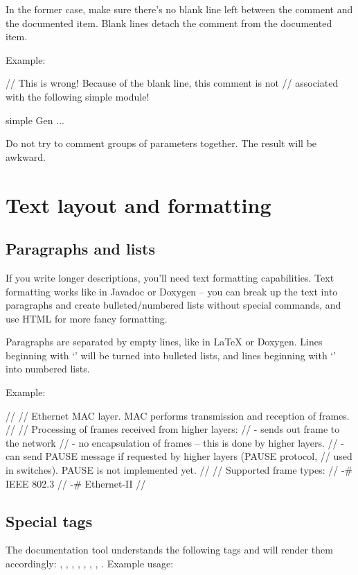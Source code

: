 In the former case, make sure there's no blank line left
between the comment and the documented item. Blank lines
detach the comment from the documented item.

Example:
\begin{ned}
// This is wrong! Because of the blank line, this comment is not
// associated with the following simple module!

simple Gen
{
    ...
}
\end{ned}

Do not try to comment groups of parameters together. The result
will be awkward.

\section{Text layout and formatting}

\subsection{Paragraphs and lists}

If you write longer descriptions, you'll need text formatting capabilities.
Text formatting works like in Javadoc or Doxygen -- you can break up the
text into paragraphs and create bulleted/numbered lists without
special commands, and use HTML for more fancy formatting.

Paragraphs are separated by empty lines, like in LaTeX or Doxygen.
Lines beginning with `\ttt{-}' will be turned into bulleted lists,
and lines beginning with `\ttt{-\#}' into numbered lists.

Example:

\begin{ned}
//
// Ethernet MAC layer. MAC performs transmission and reception of frames.
//
// Processing of frames received from higher layers:
// - sends out frame to the network
// - no encapsulation of frames -- this is done by higher layers.
// - can send PAUSE message if requested by higher layers (PAUSE protocol,
//   used in switches). PAUSE is not implemented yet.
//
// Supported frame types:
// -# IEEE 802.3
// -# Ethernet-II
//
\end{ned}


\subsection{Special tags}

The documentation tool understands the following tags and will render them accordingly:
, , , , , ,
, . Example usage:

